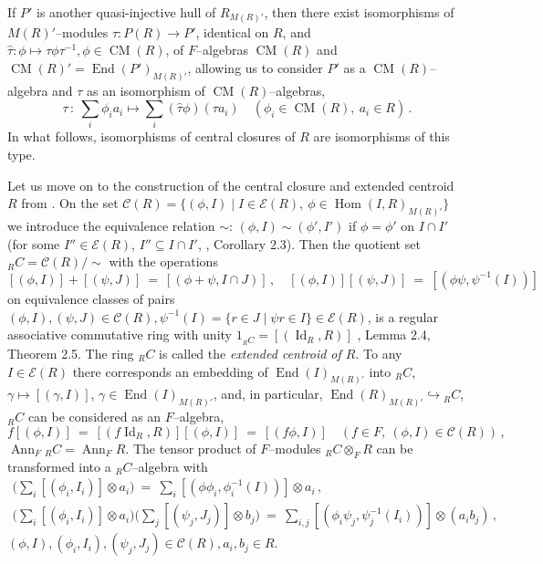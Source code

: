 \documentclass[a4paper,11pt]{article}
\DeclareMathOperator{\Id}{Id}
\DeclareMathOperator{\Hom}{Hom}
\DeclareMathOperator{\End}{End}
\DeclareMathOperator{\CM}{CM}
\DeclareMathOperator{\Ann}{Ann}
\begin{document}
If $P'$ is another quasi-injective hull of $R_{M(R)'}$, then there exist 
isomorphisms of $M(R)'$--modules ${\tau: P(R)\longrightarrow P'}$, identical on 
$R$, and ${\hat{\tau}: \phi\longmapsto \tau \phi \tau^{-1}, \phi\in \CM(R)}$, 
of $F$--algebras $\CM(R)$ and ${\CM(R)'=\End(P')_{M(R)'}}$, allowing us to 
consider $P'$ as a $\CM(R)$--algebra and $\tau$ as an isomorphism of 
$\CM(R)$--algebras, 
\[
\tau\,:\ \sum_i \phi_i a_i\longmapsto 
\sum_i (\hat{\tau} \phi)(\tau a_i)\quad (\phi_i\in \CM(R),\ a_i\in R)\,.
\]
In what follows, isomorphisms of central closures of $R$ are isomorphisms of 
this type. 

Let us move on to the construction of the central closure and extended centroid 
$R$ from \cite{Mart, EMO, BM}. On the set  
${\mathcal{C}(R)=\{(\phi, I)\mid I\in \mathcal{E}(R),\ 
\phi\in \Hom(I, R)_{M(R)'}\}}$ we introduce the equi\-valence relation $\sim$: 
${(\phi, I)\sim (\phi', I')}$ if ${\phi=\phi'}$ on 
${I\cap I'}$ (for some ${I''\in \mathcal{E}(R)}$, ${I''\subseteq I\cap I'}$, 
\cite{BM}, Corollary 2.3). Then the quotient set 
${{}_R C=\mathcal{C}(R)/\sim}$ with the operations  
\[
[(\phi, I)]+[(\psi, J)]\ =\ [(\phi+\psi, I\cap J)]\,,\quad 
[(\phi, I)] [(\psi, J)]\ =\ [(\phi \psi, \psi^{-1}(I))]
\]
on equivalence classes of pairs ${(\phi, I), (\psi, J)\in \mathcal{C}(R), 
\psi^{-1}(I)=\{r\in J\mid \psi r\in I\}\in \mathcal{E}(R)}$, is a regular 
associative commutative ring with unity ${1_{{}_R C}=[(\Id_R, R)]}$  
\cite{BM}, Lemma 2.4, Theorem 2.5. The ring ${}_R C$ is called the 
\emph{extended centroid of $R$}. To any ${I\in \mathcal{E}(R)}$ there 
corresponds an embedding of $\End(I)_{M(R)'}$ into ${}_R C$, 
${\gamma\longmapsto [(\gamma, I)]}$, ${\gamma\in \End(I)_{M(R)'}}$, and, 
in particular, ${\End(R)_{M(R)'}\hookrightarrow {}_R C}$, ${}_R C$ can be 
considered as an $F$--algebra, 
\[
f [(\phi, I)]\ =\ [(f \Id_R, R)] [(\phi, I)]\ =\ [(f \phi, I)]\quad 
(f\in F,\ (\phi, I)\in \mathcal{C}(R))\,,
\]
${\Ann_F {}_R C=\Ann_F R}$. The tensor product of $F$--modules 
${{}_R C\mathbin{\otimes_F} R}$ can be transformed into 
a ${}_R C$--algebra with  
\begin{gather*}
[(\phi, I)] \biggl(\sum_i [(\phi_i, I_i)]\otimes a_i\biggr)\ =\ 
\sum_i [(\phi \phi_i, \phi_i^{-1}(I))]\otimes a_i\,,
\\
\biggl(\sum_i [(\phi_i, I_i)]\otimes a_i\biggr) 
\biggl(\sum_j [(\psi_j, J_j)]\otimes b_j\biggr)\ =\ 
\sum_{i, j} [(\phi_i \psi_j, \psi_j^{-1}(I_i))]\otimes (a_i b_j)\,,
\end{gather*}
${(\phi, I), (\phi_i, I_i), (\psi_j, J_j)\in \mathcal{C}(R), a_i, b_j\in R}$. 
\end{document}
